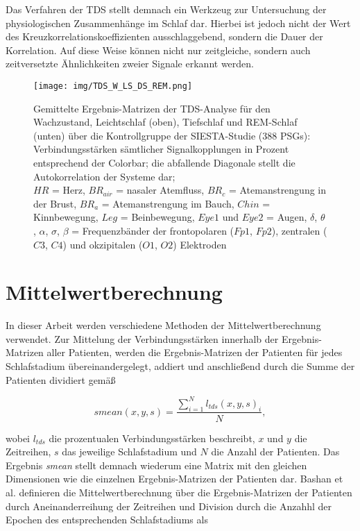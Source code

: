 Das Verfahren der TDS stellt demnach ein Werkzeug zur Untersuchung der physiologischen Zusammenhänge im Schlaf dar. Hierbei ist jedoch nicht der Wert des Kreuzkorrelationskoeffizienten ausschlaggebend, sondern die Dauer der Korrelation. Auf diese Weise können nicht nur zeitgleiche, sondern auch zeitversetzte Ähnlichkeiten zweier Signale erkannt werden. \parencite{bashan_network_2012}

\begin{figure}[H]
	\centering
	\texttt{[image: img/TDS\_W\_LS\_DS\_REM.png]}
	\caption[Ergebnis-Matrizen der \acs{TDS}]{Gemittelte Ergebnis-Matrizen der \acs{TDS}-Analyse für den Wachzustand, Leichtschlaf (oben), Tiefschlaf und \acs{REM}-Schlaf (unten) über die Kontrollgruppe der SIESTA-Studie (388 \acs{PSG}s):\\Verbindungsstärken sämtlicher Signalkopplungen in Prozent entsprechend der Colorbar; die abfallende Diagonale stellt die Autokorrelation der Systeme dar;\\$HR$ = Herz, $BR_{air}$ = nasaler Atemfluss, $BR_c$ = Atemanstrengung in der Brust, $BR_a$ = Atemanstrengung im Bauch, $Chin$ = Kinnbewegung, $Leg$ = Beinbewegung, $Eye1$ und $Eye2$ = Augen, $\delta$, $\theta$, $\alpha$, $\sigma$, $\beta$ = Frequenzbänder der frontopolaren ($Fp1$, $Fp2$), zentralen ($C3$, $C4$) und okzipitalen ($O1$, $O2$) Elektroden}
	\label{fig:TDS_Matrizen}
\end{figure}

\newpage

\section{Mittelwertberechnung}

In dieser Arbeit werden verschiedene Methoden der Mittelwertberechnung verwendet. Zur Mittelung der Verbindungsstärken innerhalb der Ergebnis-Matrizen aller Patienten, werden die Ergebnis-Matrizen der Patienten für jedes Schlafstadium übereinandergelegt, addiert und anschließend durch die Summe der Patienten dividiert gemäß

\begin{equation}
smean(x,y,s) = \frac{\sum \limits_{i=1}^N l_{tds}(x,y,s)_i}{N},
	\label{eq:smean}
\end{equation}

wobei $l_{tds}$ die prozentualen Verbindungsstärken beschreibt, $x$ und $y$ die Zeitreihen, $s$ das jeweilige Schlafstadium und $N$ die Anzahl der Patienten. Das Ergebnis \textit{smean} stellt demnach wiederum eine Matrix mit den gleichen Dimensionen wie die einzelnen Ergebnis-Matrizen der Patienten dar. Bashan et al. definieren die Mittelwertberechnung über die Ergebnis-Matrizen der Patienten durch Aneinanderreihung der Zeitreihen und Division durch die Anzahhl der Epochen des entsprechenden Schlafstadiums als 

